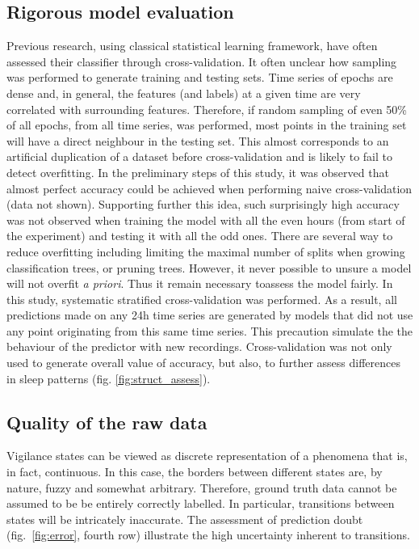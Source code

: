 \subsection{Rigorous model evaluation}

Previous research, using classical statistical learning framework,
have often assessed their classifier through cross-validation.
It often unclear how sampling was performed to generate training and testing sets.
Time series of epochs are dense and, in general,
the features (and labels) at a given time are very correlated with surrounding features.
Therefore, if random sampling of even 50\% of all epochs, from all time series, was performed,
most points in the training set will have a direct neighbour in the testing set.
This almost corresponds to an artificial duplication of a dataset before cross-validation and is likely to fail to detect overfitting.
In the preliminary steps of this study, it was observed that almost perfect accuracy could be achieved when performing naive cross-validation (data not shown).
Supporting further this idea, such surprisingly high accuracy was not observed when training the model
with all the even hours (from start of the experiment) and testing it with all the odd ones.
There are several way to reduce overfitting including limiting the maximal number of splits when growing classification trees, or pruning trees.
However, it never possible to unsure a model will not overfit \emph{a priori}.
Thus it remain necessary toassess the model fairly.
In this study, systematic stratified cross-validation was performed.
As a result, all predictions made on any 24h time series are generated by models
that did not use any point originating from this same time series. This precaution simulate the the behaviour of the predictor with new recordings.
Cross-validation was not only used to generate overall value of accuracy, but also, to further assess differences in sleep patterns (fig. \ref{fig:struct_assess}).

\subsection{Quality of the raw data}

Vigilance states can be viewed as discrete representation of a phenomena that is, in fact, continuous.
In this case, the borders between different states are, by nature, fuzzy and somewhat arbitrary.
Therefore, ground truth data cannot be assumed to be be entirely correctly labelled.
In particular, transitions between states will be intricately inaccurate.
The assessment of prediction doubt (fig.~\ref{fig:error}, fourth row) illustrate the high uncertainty inherent to transitions.

